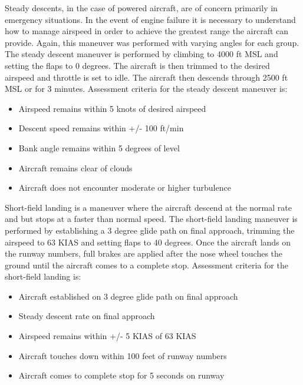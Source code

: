 \documentclass[conf]{new-aiaa}
\begin{document}
\medskip

Steady descents, in the case of powered aircraft, are of concern primarily in emergency situations. In the event of engine failure it is necessary to understand how to manage airspeed in order to achieve the greatest range the aircraft can provide. Again, this maneuver was performed with varying angles for each group. The steady descent maneuver is performed by climbing to 4000 ft MSL and setting the flaps to 0 degrees. The aircraft is then trimmed to the desired airspeed and throttle is set to idle. The aircraft then descends through 2500 ft MSL or for 3 minutes. Assessment criteria for the steady descent maneuver is:

\medskip

\begin{itemize}
\item Airspeed remains within 5 knots of desired airspeed
\item Descent speed remains within +/- 100 ft/min
\item Bank angle remains within 5 degrees of level 
\item Aircraft remains clear of clouds
\item Aircraft does not encounter moderate or higher turbulence
\end{itemize}

\medskip

Short-field landing is a maneuver where the aircraft descend at the normal rate and but stops at a faster than normal speed. The short-field landing maneuver is performed by establishing a 3 degree glide path on final approach, trimming the airspeed to 63 KIAS and setting flaps to 40 degrees. Once the aircraft lands on the runway numbers, full brakes are applied after the nose wheel touches the ground until the aircraft comes to a complete stop. Assessment criteria for the short-field landing is:

\medskip

\begin{itemize}
\item Aircraft established on 3 degree glide path on final approach
\item Steady descent rate on final approach
\item Airspeed remains within +/- 5 KIAS of 63 KIAS  
\item Aircraft touches down within 100 feet of runway numbers
\item Aircraft comes to complete stop for 5 seconds on runway
\end{itemize}
\end{document}

